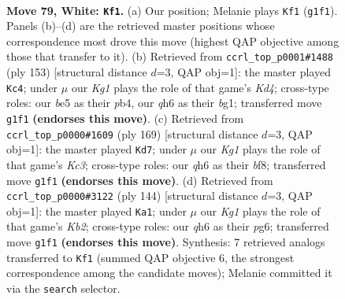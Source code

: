 \documentclass[11pt]{article}
\begin{document}
\clearpage

\begin{figure}[p]\centering
\begin{subfigure}{0.46\textwidth}\centering
\resizebox{\linewidth}{!}{%
\newchessgame
\chessboard[
  setfen={8/8/7q/4b3/8/1p1k1B2/8/6K1 w - - 0 79},
  showmover=false,
  pgfstyle=straightmove, color=movearrow, markmove={g1-f1}
]}
\caption{}
\end{subfigure}\hfill
\begin{subfigure}{0.46\textwidth}\centering
\resizebox{\linewidth}{!}{%
\newchessgame
\chessboard[
  setfen={8/8/5p2/3k3b/1P6/8/3K4/6B1 b - - 0 77},
  showmover=false,
  pgfstyle=straightmove, color=movearrow, markmove={d5-c4}
]}
\caption{}
\end{subfigure}
\\[4pt]
\begin{subfigure}{0.46\textwidth}\centering
\resizebox{\linewidth}{!}{%
\newchessgame
\chessboard[
  setfen={5B2/8/2k3b1/6P1/8/8/1K6/8 b - - 2 85},
  showmover=false,
  pgfstyle=straightmove, color=movearrow, markmove={c6-d7}
]}
\caption{}
\end{subfigure}\hfill
\begin{subfigure}{0.46\textwidth}\centering
\resizebox{\linewidth}{!}{%
\newchessgame
\chessboard[
  setfen={4k3/8/6p1/8/1B4b1/6P1/1K6/8 w - - 19 73},
  showmover=false,
  pgfstyle=straightmove, color=movearrow, markmove={b2-a1}
]}
\caption{}
\end{subfigure}
\caption{\textbf{Move 79, White: \texttt{Kf1}.} (a) Our position; Melanie plays \texttt{Kf1} (\texttt{g1f1}). Panels (b)--(d) are the retrieved master positions whose correspondence most drove this move (highest QAP objective among those that transfer to it). (b) Retrieved from \texttt{ccrl\_top\_p0001\#1488} (ply 153) [structural distance $d$=3, QAP obj=1]: the master played \texttt{Kc4}; under $\mu$ our \emph{Kg1} plays the role of that game's \emph{Kd4}; cross-type roles: our \emph{b}e5 as their \emph{p}b4, our \emph{q}h6 as their \emph{b}g1; transferred move \texttt{g1f1} \textbf{(endorses this move)}. (c) Retrieved from \texttt{ccrl\_top\_p0000\#1609} (ply 169) [structural distance $d$=3, QAP obj=1]: the master played \texttt{Kd7}; under $\mu$ our \emph{Kg1} plays the role of that game's \emph{Kc3}; cross-type roles: our \emph{q}h6 as their \emph{b}f8; transferred move \texttt{g1f1} \textbf{(endorses this move)}. (d) Retrieved from \texttt{ccrl\_top\_p0000\#3122} (ply 144) [structural distance $d$=3, QAP obj=1]: the master played \texttt{Ka1}; under $\mu$ our \emph{Kg1} plays the role of that game's \emph{Kb2}; cross-type roles: our \emph{q}h6 as their \emph{p}g6; transferred move \texttt{g1f1} \textbf{(endorses this move)}. Synthesis: 7 retrieved analogs transferred to \texttt{Kf1} (summed QAP objective 6, the strongest correspondence among the candidate moves); Melanie committed it via the \texttt{search} selector.}
\label{fig:thought-m156}
\end{figure}
\end{document}
